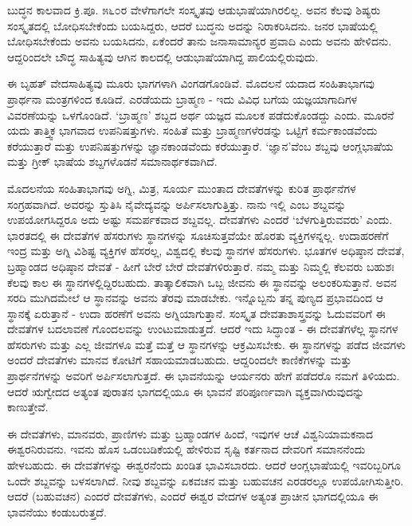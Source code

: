 ಬುದ್ಧನ ಕಾಲವಾದ ಕ್ರಿ.ಪೂ. ೫೬೦ರ ವೇಳೆಗಾಗಲೇ ಸಂಸ್ಕೃತವು ಆಡುಭಾಷೆಯಾಗಿರಲಿಲ್ಲ. ಅವನ ಕೆಲವು ಶಿಷ್ಯರು ಸಂಸ್ಕೃತದಲ್ಲಿ ಬೋಧಿಸಬೇಕೆಂದು ಬಯಸಿದ್ದರು, ಆದರೆ ಬುದ್ಧನು ಅದನ್ನು ನಿರಾಕರಿಸಿದನು. ಜನರ ಭಾಷೆಯಲ್ಲಿ ಬೋಧಿಸಬೇಕೆಂದು ಅವನು ಬಯಸಿದನು, ಏಕೆಂದರೆ ತಾನು ಜನಾಸಾಮಾನ್ಯರ ಪ್ರವಾದಿ ಎಂದು ಅವನು ಹೇಳಿದನು. ಆದ್ದರಿಂದಲೇ ಬೌದ್ಧ ಸಾಹಿತ್ಯವು ಆಗಿನ ಕಾಲದಲ್ಲಿ ಆಡುಭಾಷೆಯಾಗಿದ್ದ ಪಾಲಿಯಲ್ಲಿರುವುದು.

ಈ ಬೃಹತ್ ವೇದಸಾಹಿತ್ಯವು ಮೂರು ಭಾಗಗಳಾಗಿ ವಿಂಗಡಗೊಂಡಿವೆ. ಮೊದಲನೆ ಯದಾದ ಸಂಹಿತಾಭಾಗವು ಪ್ರಾರ್ಥನಾ ಮಂತ್ರಗಳಿಂದ ಕೂಡಿದೆ. ಎರಡೆಯದು ಬ್ರಾಹ್ಮಣ - ಇದು ವಿವಿಧ ಬಗೆಯ ಯಜ್ಞಯಾಗಾದಿಗಳ ವಿವರಣೆಯನ್ನು ಒಳಗೊಂಡಿದೆ. ‘ಬ್ರಾಹ್ಮಣ’ ಶಬ್ದದ ಅರ್ಥ ಯಜ್ಞದ ಮೂಲಕ ಪಡೆದುಕೊಂಡದ್ದು ಎಂದು. ಮೂರನೆ ಯದು ತಾತ್ತ್ವಿಕ ಭಾಗವಾದ ಉಪನಿಷತ್ತುಗಳು. ಸಂಹಿತೆ ಮತ್ತು ಬ್ರಾಹ್ಮಣಗಳೆರಡನ್ನು ಒಟ್ಟಿಗೆ ಕರ್ಮಕಾಂಡವೆಂದು ಕರೆಯುತ್ತಾರೆ ಮತ್ತು ಉಪನಿಷತ್ತುಗಳನ್ನು ಜ್ಞಾನಕಾಂಡವೆಂದು ಕರೆಯುತ್ತಾರೆ. ‘ಜ್ಞಾನ’ವೆಂಬ ಶಬ್ದವು ಆಂಗ್ಲಭಾಷೆಯ  ಮತ್ತು ಗ್ರೀಕ್ ಭಾಷೆಯ  ಶಬ್ದಗಳೊಡನೆ ಸಮಾನಾರ್ಥಕವಾಗಿದೆ.

ಮೊದಲನೆಯ ಸಂಹಿತಾಭಾಗವು ಅಗ್ನಿ, ಮಿತ್ರ, ಸೂರ್ಯ ಮುಂತಾದ ದೇವತೆಗಳನ್ನು ಕುರಿತ ಪ್ರಾರ್ಥನೆಗಳ ಸಂಗ್ರಹವಾಗಿದೆ. ಅವರನ್ನು ಸ್ತುತಿಸಿ ನೈವೇದ್ಯವನ್ನು ಅರ್ಪಿಸಲಾಗುತ್ತಿತ್ತು. ನಾನು ಇಲ್ಲಿ  ಎಂಬ ಶಬ್ದವನ್ನು ಉಪಯೋಗಸಿದ್ದರೂ ಅದು ಅಷ್ಟು ಸಮರ್ಪಕವಾದ ಶಬ್ದವಲ್ಲ. ದೇವತೆಗಳು ಎಂದರೆ ‘ಬೆಳಗುತ್ತಿರುವವರು’ ಎಂದು. ಭಾರತದಲ್ಲಿ ಈ ದೇವತೆಗಳ ಹೆಸರುಗಳು ಸ್ಥಾನಗಳನ್ನು ಸೂಚಿಸುತ್ತವೆಯೇ ಹೊರತು ವ್ಯಕ್ತಿಗಳನ್ನಲ್ಲ. ಉದಾಹರಣೆಗೆ ಇಂದ್ರ ಮತ್ತು ಅಗ್ನಿ ವಿಶಿಷ್ಟ ವ್ಯಕ್ತಿಗಳ ಹೆಸರಲ್ಲ, ವಿಶ್ವದಲ್ಲಿ ಕೆಲವು ಸ್ಥಾನಗಳ ಹೆಸರುಗಳು. ಭೂತಗಳ ಅಧಿಷ್ಠಾನ ದೇವತೆ, ಬ್ರಹ್ಮಾಂಡದ ಅಧಿಷ್ಠಾನ ದೇವತೆ - ಹೀಗೆ ಬೇರೆ ಬೇರೆ ದೇವತೆಗಳಿರುತ್ತಾರೆ. ನಮ್ಮ ಮತ್ತು ನಿಮ್ಮಲ್ಲಿ ಕೆಲವರು ಬಹುಶಃ ಕೆಲವು ಕಾಲ ಈ ಸ್ಥಾನಗಳಲ್ಲಿದ್ದಿರಬಹುದು. ತಾತ್ಕಾಲಿಕವಾಗಿ ಒಬ್ಬ ಜೀವನು ಈ ಸ್ಥಾನವನ್ನು ಅಲಂಕರಿಸುತ್ತಾನೆ. ಅವನ ಸರದಿ ಮುಗಿದಮೇಲೆ ಆ ಸ್ಥಾನವನ್ನು ಅವನು ತೆರವು ಮಾಡಬೇಕು. ಇನ್ನೊಬ್ಬನು ತನ್ನ ಪುಣ್ಯದ ಪ್ರಭಾವದಿಂದ ಆ ಸ್ಥಾನಕ್ಕೆ ಏರುತ್ತಾನೆ - ಉದಾ ಹರಣೆಗೆ ಅವನು ಅಗ್ನಿಯಾಗುತ್ತಾನೆ. ಸಂಸ್ಕೃತ ದೇವತಾಶಾಸ್ತ್ರವನ್ನು ಓದುವವರಿಗೆ ಈ ದೇವತೆಗಳ ಬದಲಾವಣೆ ಗೊಂದಲವನ್ನು ಉಂಟುಮಾಡುತ್ತದೆ. ಆದರೆ ಇದು ಸಿದ್ಧಾಂತ - ಈ ದೇವತೆಗಳೆಲ್ಲ ಸ್ಥಾನಗಳ ಹೆಸರುಗಳು ಮತ್ತು ಎಲ್ಲ ಜೀವಗಳೂ ಮತ್ತೆ ಮತ್ತೆ ಆ ಸ್ಥಾನಗಳನ್ನು ಆಕ್ರಮಿಸಬೇಕು. ಈ ಸ್ಥಾನಗಳನ್ನು ಪಡೆದ ಜೀವಗಳು ಅಂದರೆ ದೇವತೆಗಳು ಮಾನವ ಕೋಟಿಗೆ ಸಹಾಯಮಾಡಬಹುದು. ಆದ್ದರಿಂದಲೇ ಕಾಣಿಕೆಗಳನ್ನು ಮತ್ತು ಪ್ರಾರ್ಥನೆಗಳನ್ನು ಅವರಿಗೆ ಅರ್ಪಿಸಲಾಗುತ್ತದೆ. ಈ ಭಾವನೆಯನ್ನು ಆರ್ಯನರು ಹೇಗೆ ಪಡೆದರೊ ನಮಗೆ ತಿಳಿಯದು. ಆದರೆ ಋಗ್ವೇದದ ಅತ್ಯಂತ ಪುರಾತನ ಭಾಗದಲ್ಲಿಯೂ ಈ ಭಾವನೆ ಪರಿಪೂರ್ಣವಾಗಿ ವ್ಯಕ್ತವಾಗಿರುವುದನ್ನು ಕಾಣುತ್ತೇವೆ.

ಈ ದೇವತೆಗಳು, ಮಾನವರು, ಪ್ರಾಣಿಗಳು ಮತ್ತು ಬ್ರಹ್ಮಾಂಡಗಳ ಹಿಂದೆ, ಇವುಗಳ ಆಚೆ ವಿಶ್ವನಿಯಾಮಕನಾದ ಈಶ್ವರನಿರುವನು. ಇವನು ಹೊಸ ಒಡಂಬಡಿಕೆಯಲ್ಲಿ ಹೇಳಿರುವ ಸೃಷ್ಟಿ ಕರ್ತನಾದ ದೇವರಿಗೆ  ಸಮಾನನೆಂದು ಹೇಳಬಹುದು. ಈ ದೇವತೆಗಳನ್ನು ಈಶ್ವರನೆಂದು ಖಂಡಿತ ಭಾವಿಸಬಾರದು. ಆದರೆ ಆಂಗ್ಲಭಾಷೆಯಲ್ಲಿ ಇವರಿಬ್ಬರಿಗೂ ಒಂದೇ ಶಬ್ದವನ್ನು ಬಳಸಲಾಗಿದೆ. ನೀವು ಶಬ್ದವನ್ನು ಏಕವಚನ ಮತ್ತು ಬಹುವಚನ ಎರಡರಲ್ಲೂ ಉಪಯೋಗಿಸುತ್ತೀರಿ. ಆದರೆ (ಬಹುವಚನ) ಎಂದರೆ ದೇವತೆಗಳು,  ಎಂದರೆ ಈಶ್ವರ ವೇದಗಳ ಅತ್ಯಂತ ಪ್ರಾಚೀನ ಭಾಗದಲ್ಲಿಯೂ ಈ ಭಾವನೆಯು ಕಂಡುಬರುತ್ತದೆ.

